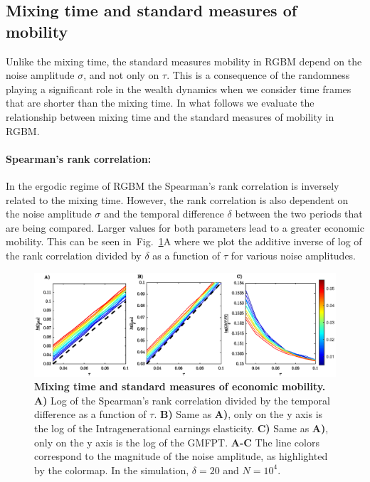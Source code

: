 \documentclass[11pt]{article}
\newcommand{\fref}[1]{Fig.~\ref{fig:#1}}
\numberwithin{equation}{section}
\begin{document}
\FloatBarrier

\subsection{Mixing time and standard measures of mobility}\label{sec:measures}

Unlike the mixing time, the standard measures mobility in RGBM depend on the noise amplitude $\sigma$, and not only on $\tau$. This is a consequence of the randomness playing a significant role in the wealth dynamics when we consider time frames that are shorter than the mixing time. In what follows we evaluate the relationship between mixing time and the standard measures of mobility in RGBM.

\paragraph{Spearman's rank correlation:} In the ergodic regime of RGBM the Spearman's rank correlation is inversely related to the mixing time. However, the rank correlation is also dependent on the noise amplitude $\sigma$ and the temporal difference $\delta$ between the two periods that are being compared. Larger values for both parameters lead to a greater economic mobility. This can be seen in~\fref{rgbm-standard-measures}A where we plot the additive inverse of log of the rank correlation divided by $\delta$ as a function of $\tau$ for various noise amplitudes.

\begin{figure}[!htb]
\centering
\includegraphics[width=1.0\textwidth]{figs/fig_mixing_time_vs_standard_measures.eps}
\caption{\textbf{Mixing time and standard measures of economic mobility.} \textbf{A)} Log of the Spearman's rank correlation divided by the temporal difference as a function of $\tau$. \textbf{B)} Same as \textbf{A)}, only on the y axis is the log of the Intragenerational earnings elasticity. \textbf{C)} Same as \textbf{A)}, only on the y axis is the log of the GMFPT. \textbf{A-C} The line colors correspond to the magnitude of the noise amplitude, as highlighted by the colormap. In the simulation, $\delta = 20$ and $N = 10^4$.
\label{fig:rgbm-standard-measures}}
\end{figure}
\end{document}
